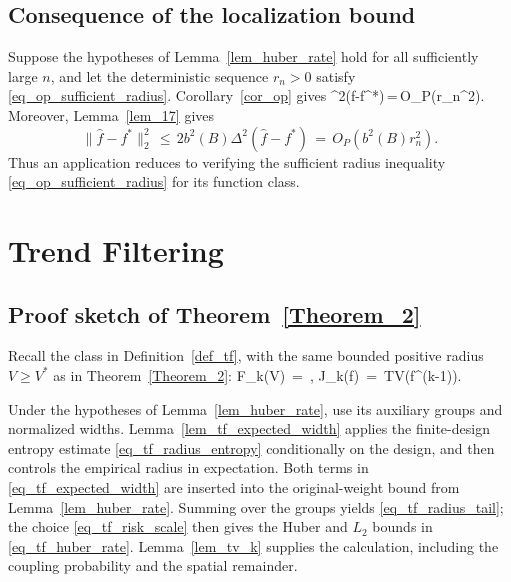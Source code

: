 \documentclass[twoside,11pt]{article}
\newcommand{\rev}[1]{{\color{revisionred}#1}}
\newenvironment{revision}{\color{revisionred}}{}
\begin{document}
\subsection{\rev{Consequence of the localization bound}}
\begin{revision}
Suppose the hypotheses of Lemma~\ref{lem_huber_rate} hold for all
sufficiently large $n$, and let the deterministic sequence $r_n>0$
satisfy \eqref{eq_op_sufficient_radius}. Corollary~\ref{cor_op}
gives
\beq
\label{c_eq700}
\Delta^2(\hat f-f^*)\,=\,O_P(r_n^2).
\beq
Moreover, Lemma~\ref{lem_17} gives
\[
\|\hat f-f^*\|_2^2
\,\leq\,2b^2(B)\Delta^2(\hat f-f^*)
\,=\,O_P\left(b^2(B)r_n^2\right).
\]
Thus an application reduces to verifying the sufficient radius
inequality \eqref{eq_op_sufficient_radius} for its function class.
\end{revision} 


% 








\section{Trend Filtering}

\subsection{Proof sketch of Theorem~\ref{Theorem_2}}


\begin{revision}
Recall the class in Definition~\ref{def_tf}, with the same bounded positive radius $V\geq V^*$ as in Theorem~\ref{Theorem_2}:
\bea
F_k(V) \,=\, ,
\qquad J_k(f) \,=\, TV(f^{(k-1)}).
\bea
\end{revision}



\begin{revision}
Under the hypotheses of Lemma~\ref{lem_huber_rate}, use its auxiliary
groups and normalized widths. Lemma~\ref{lem_tf_expected_width} applies
the finite-design entropy estimate \eqref{eq_tf_radius_entropy}
conditionally on the design, and then controls the empirical radius
in expectation. Both terms in \eqref{eq_tf_expected_width} are
inserted into the original-weight bound from
Lemma~\ref{lem_huber_rate}. Summing over the groups yields
\eqref{eq_tf_radius_tail}; the choice \eqref{eq_tf_risk_scale}
then gives the Huber and $L_2$ bounds in \eqref{eq_tf_huber_rate}.
Lemma~\ref{lem_tv_k} supplies the calculation, including the coupling
probability and the spatial remainder.
\end{revision}
\end{document}
